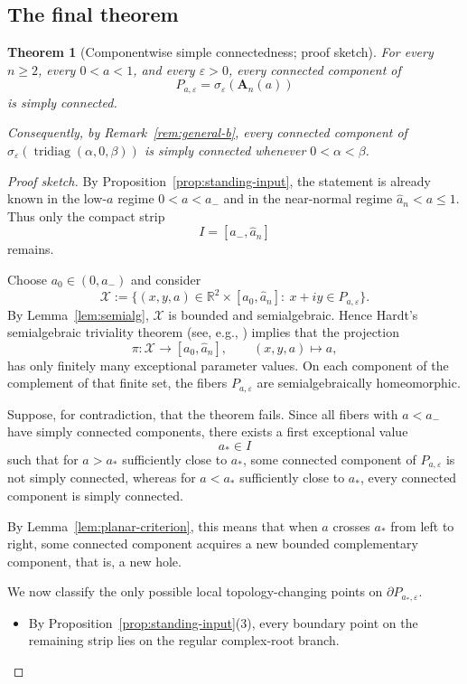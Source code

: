 \documentclass[11pt]{article}
\newtheorem{theorem}{Theorem}[section]
\DeclareMathOperator{\tridiag}{tridiag}
\newcommand{\R}{\mathbb{R}}
\begin{document}
\subsection*{The final theorem}

\begin{theorem}[Componentwise simple connectedness; proof sketch]\label{thm:main}
For every \(n\ge 2\), every \(0<a<1\), and every \(\varepsilon>0\), every connected component of
\[
P_{a,\varepsilon}
=
\sigma_\varepsilon(\mathbf A_n(a))
\]
is simply connected.

Consequently, by Remark~\ref{rem:general-b}, every connected component of \(\sigma_\varepsilon(\tridiag(\alpha,0,\beta))\) is simply connected whenever \(0<\alpha<\beta\).
\end{theorem}

\begin{proof}[Proof sketch]
By Proposition~\ref{prop:standing-input}, the statement is already known in the low-\(a\) regime \(0<a<a_-\) and in the near-normal regime \(\widehat a_n<a\le 1\). Thus only the compact strip
\[
I=[a_-,\widehat a_n]
\]
remains.

Choose \(a_0\in(0,a_-)\) and consider
\[
\mathcal X
:=
\{(x,y,a)\in \R^2\times [a_0,\widehat a_n]:\ x+iy\in P_{a,\varepsilon}\}.
\]
By Lemma~\ref{lem:semialg}, \(\mathcal X\) is bounded and semialgebraic. Hence Hardt's semialgebraic triviality theorem (see, e.g., \cite{BCR}) implies that the projection
\[
\pi:\mathcal X\to [a_0,\widehat a_n],\qquad (x,y,a)\mapsto a,
\]
has only finitely many exceptional parameter values. On each component of the complement of that finite set, the fibers \(P_{a,\varepsilon}\) are semialgebraically homeomorphic.

Suppose, for contradiction, that the theorem fails. Since all fibers with \(a<a_-\) have simply connected components, there exists a first exceptional value
\[
a_*\in I
\]
such that for \(a>a_*\) sufficiently close to \(a_*\), some connected component of \(P_{a,\varepsilon}\) is not simply connected, whereas for \(a<a_*\) sufficiently close to \(a_*\), every connected component is simply connected.

By Lemma~\ref{lem:planar-criterion}, this means that when \(a\) crosses \(a_*\) from left to right, some connected component acquires a new bounded complementary component, that is, a new hole.

We now classify the only possible local topology-changing points on \(\partial P_{a_*,\varepsilon}\).

\begin{itemize}
\item By Proposition~\ref{prop:standing-input}(3), every boundary point on the remaining strip lies on the regular complex-root branch.


\end{itemize}
\end{proof}
\end{document}
